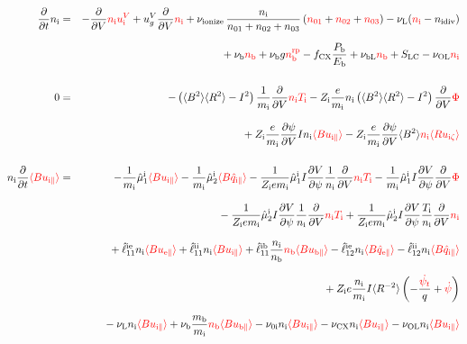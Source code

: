 \documentclass[11pt]{article}
\def\r#1{{\rm#1}}
\def\aves#1{\langle#1\rangle}
\def\dd#1#2{\frac{\partial #1}{\partial #2}}
\def\para{\parallel}
\def\ddV{\frac{\partial}{\partial V}}
\def\psid{\dot{\psi}}
\def\psit{\psi_t}
\def\psitd{\dot{\psit}}
\def\mi{m_\r{i}}
\def\mb{m_\r{b}}
\def\ni{n_\r{i}}
\def\nb{n_\r{b}}
\def\nna{n_{01}}
\def\nnb{n_{02}}
\def\nnc{n_{03}}
\def\Ti{T_\r{i}}
\def\Zi{Z_\r{i}}
\def\Pb{P_\r{b}}
\def\Eb{E_\r{b}}
\def\uizt{u_{\r{i}\zeta}}
\def\uepara{u_{\r{e}\para}}
\def\uipara{u_{\r{i}\para}}
\def\ubpara{u_{\r{b}\para}}
\def\qhatepara{\hat{q}_{\r{e}\para}}
\def\qhatipara{\hat{q}_{\r{i}\para}}
\def\uiV{u_\r{i}^V}
\def\ugV{u_{g}^V}
\def\bri{\aves{B^2}\aves{R^2} - I^2}
\def\ddt{\frac{\partial}{\partial t}}
\def\nbrp{n_\r{b}^\r{rp}}
\def\fCX{f_\r{CX}}
\def\nuni{\nu_\r{0i}}
\def\nuL{\nu_\r{L}}
\def\nuCX{\nu_\r{CX}}
\def\nuion{\nu_\r{ionize}}
\def\nub{\nu_\r{b}}
\def\nidiv{n_\r{idiv}}
\def\nuOL{\nu_\r{OL}}
\def\nubL{\nu_\r{bL}}
\def\red#1{\textcolor{red}{#1}}
\begin{document}
%
\begin{eqnarray}
  \ddt \ni &=&
%
  - \ddV \red{\ni\uiV}
%
  + \ugV \ddV \red{\ni}
%
  + \nuion\, \frac{\ni}{\nna + \nnb + \nnc}\, (\red{\nna} +
  \red{\nnb} + \red{\nnc})
%
  - \nuL (\red{\ni} - \nidiv) 
\nonumber\\[2.5mm]&&{}
%
  + \nub \red{\nb}
%
  + \nub g \red{\nbrp}
%
  - \fCX \frac{\Pb}{\Eb}
%
  + \nubL \red{\nb}
%
  + S_\r{LC}
%
  - \nuOL \red{\ni}
%
\\[5mm]
  0 &=&
%
  -           \left( \bri \right) \frac{1}{\mi} \ddV \red{\ni \Ti}
%
  - \Zi \frac{e}{\mi} \ni \left( \bri \right) \ddV \red{\Phi}
\nonumber\\[3mm]&&{}
%
  + \Zi \frac{e}{\mi} \dd{\psi}{V} I \ni \red{\aves{B\uipara}}
%
  - \Zi \frac{e}{\mi} \dd{\psi}{V} \aves{B^2} \red{\ni \aves{R\uizt}}
\\[5mm]
  \ni \ddt \red{\aves{B \uipara}} &=&
%
  - \frac{1}{\mi} \hat{\mu}_1^\r{i} \red{\aves{B \uipara}}
  - \frac{1}{\mi} \hat{\mu}_2^\r{i} \red{\aves{B \qhatipara}}
%
  - \frac{1}{\Zi e\mi} \hat{\mu}_1^\r{i} I \dd{V}{\psi} \frac{1}{\ni}
  \ddV \red{\ni\Ti}
  - \frac{1}{\mi} \hat{\mu}_1^\r{i} I \dd{V}{\psi} \ddV \red{\Phi}
\nonumber\\[3mm]&&{}
%
  - \frac{1}{\Zi e\mi} \hat{\mu}_2^\r{i} I \dd{V}{\psi} \frac{1}{\ni}
  \ddV \red{\ni\Ti}
  + \frac{1}{\Zi e\mi} \hat{\mu}_2^\r{i} I \dd{V}{\psi} \frac{\Ti}{\ni}
  \ddV \red{\ni}
\nonumber\\[3mm]&&{}
%
  + \hat{\ell}_{11}^{\r{ie}} \ni \red{\aves{B \uepara}}
  + \hat{\ell}_{11}^{\r{ii}} \ni \red{\aves{B \uipara}}
  + \hat{\ell}_{11}^{\r{ib}} \frac{\ni}{\nb} \red{\nb \aves{B \ubpara}}
%
  - \hat{\ell}_{12}^{\r{ie}} \ni \red{\aves{B \qhatepara}}
  - \hat{\ell}_{12}^{\r{ii}} \ni \red{\aves{B \qhatipara}}
\nonumber\\[3mm]&&{}
%
  + \Zi e \frac{\ni}{\mi} I \aves{R^{-2}} \left( - \frac{\red{\psitd}}{q} + \red{\psid} \right)
%
%
\nonumber\\[3mm]&&{}
%
  - \nuL  \ni \red{\aves{B \uipara}}
%
  + \nub  \frac{\mb}{\mi} \red{\nb \aves{B \ubpara}}
%
  - \nuni \ni \red{\aves{B \uipara}}
%
  - \nuCX \ni \red{\aves{B \uipara}}
%
  - \nuOL \ni \red{\aves{B \uipara}}
\nonumber\\[3mm]&&{}

\end{eqnarray}
\end{document}
